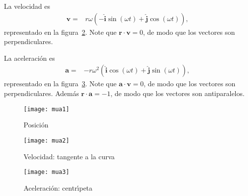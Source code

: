 La velocidad es
\begin{align}
  \mathbf{v}=&%
  r\omega\left(-\hat{\mathbf{i}}\sin(\omega t)+\hat{\mathbf{j}}\cos(\omega t)\right),
\end{align}
representado en la figura~\ref{fig:mua2}. Note que $\mathbf{r}\cdot\mathbf{v}=0$, de modo que los vectores son perpendiculares.

La aceleraci\'on es
\begin{align}
  \mathbf{a}=&%
  -r\omega^2\left(\hat{\mathbf{i}}\cos(\omega t)+\hat{\mathbf{j}}\sin(\omega t)\right),
\end{align}
representado en la figura~\ref{fig:mua3}. Note que $\mathbf{a}\cdot\mathbf{v}=0$, de modo que los vectores son perpendiculares. Adem\'as
$\mathbf{r}\cdot\mathbf{a}=-1$, de modo que los vectores son antiparalelos.


\begin{frame}
  \begin{figure}
    \centering
    \texttt{[image: mua1]}    
    \caption{Posici\'on}
    \label{fig:mua1}
  \end{figure}

\end{frame}
\begin{frame}
  \begin{figure}
    \centering
    \texttt{[image: mua2]}    
    \caption{Velocidad: tangente a la curva}
    \label{fig:mua2}
  \end{figure}
\end{frame}

\begin{frame}
  \begin{figure}
    \centering
    \texttt{[image: mua3]}
    \caption{Aceleraci\'on: centr\'\i peta}
    \label{fig:mua3}
  \end{figure}


\end{frame}

